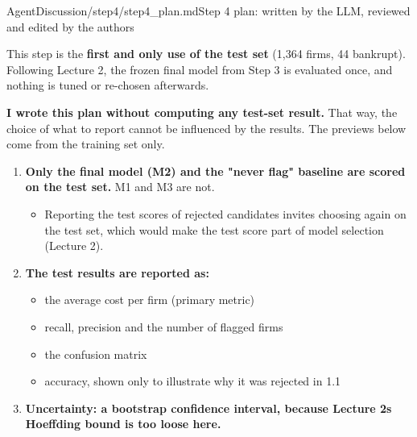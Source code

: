 \begin{mdfile}{AgentDiscussion/\allowbreak{}step4/\allowbreak{}step4\_plan.md}{Step 4 plan: written by the LLM, reviewed and edited by the authors}

This step is the \textbf{first and only use of the test set} (1,364 firms, 44 bankrupt). Following Lecture 2, the frozen final model from Step 3 is evaluated once, and nothing is tuned or re-chosen afterwards.

\textbf{I wrote this plan without computing any test-set result.} That way, the choice of what to report cannot be influenced by the results. The previews below come from the training set only.


\begin{enumerate}
\def\labelenumi{\arabic{enumi}.}
\tightlist
\item
  \textbf{Only the final model (M2) and the "never flag" baseline are scored on the test set.} M1 and M3 are not.

  \begin{itemize}
  \tightlist
  \item
    Reporting the test scores of rejected candidates invites choosing again on the test set, which would make the test score part of model selection (Lecture 2).
  \end{itemize}
\item
  \textbf{The test results are reported as:}

  \begin{itemize}
  \tightlist
  \item
    the average cost per firm (primary metric)
  \item
    recall, precision and the number of flagged firms
  \item
    the confusion matrix
  \item
    accuracy, shown only to illustrate why it was rejected in 1.1
  \end{itemize}
\item
  \textbf{Uncertainty: a bootstrap confidence interval, because Lecture 2\textquotesingle s Hoeffding bound is too loose here.}


\end{enumerate}
\end{mdfile}
